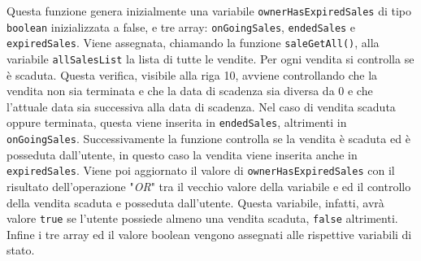 \documentclass[a4paper]{article}
\begin{document}
        Questa funzione genera inizialmente una variabile \verb|ownerHasExpiredSales| di tipo \verb|boolean| inizializzata a false, e tre array: \verb|onGoingSales|, \verb|endedSales| e \verb|expiredSales|.
        Viene assegnata, chiamando la funzione \verb|saleGetAll()|, alla variabile \verb|allSalesList| la lista di tutte le vendite. Per ogni vendita si controlla se è scaduta. Questa verifica, visibile alla riga 10, avviene controllando
        che la vendita non sia terminata e che la data di scadenza sia diversa da 0 e che l'attuale data sia successiva alla data di scadenza. Nel caso di vendita scaduta oppure terminata, questa viene inserita in \verb|endedSales|, altrimenti
        in \verb|onGoingSales|. Successivamente la funzione controlla se la vendita è scaduta ed è posseduta dall'utente, in questo caso la vendita viene inserita anche in \verb|expiredSales|. Viene poi aggiornato il valore di \verb|ownerHasExpiredSales|
        con il risultato dell'operazione "\emph{OR}" tra il vecchio valore della variabile e ed il controllo della vendita scaduta e posseduta dall'utente. Questa variabile, infatti, avrà valore \verb|true| se l'utente possiede almeno una vendita scaduta, \verb|false| altrimenti.
        Infine i tre array ed il valore boolean vengono assegnati alle rispettive variabili di stato.
\end{document}
